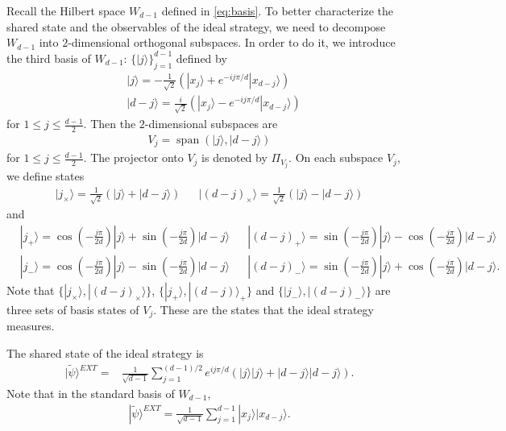 \documentclass[11pt,letterpaper]{article}
\newcommand{\ket}[1]{|#1\rangle}
\DeclareMathOperator{\spn}{span}
\newcommand{\1}{\mathbb{1}}
\newcommand{\EXT}{EXT}
\newcommand{\tpsi}{\tilde{\psi}}
\theoremstyle{definition}
\begin{document}
Recall the Hilbert space $W_{d-1}$ defined in \cref{eq:basis}. 
To better characterize the shared state and the observables of the ideal strategy, we need to decompose $W_{d-1}$ into $2$-dimensional
orthogonal subspaces.
In order to do it, we introduce the third basis of $W_{d-1}$: $\{ \ket{j} \}_{j=1}^{d-1}$ defined by
\begin{align}
    \label{eq:ketj}
    &\ket{j} = -\frac{1}{\sqrt{2}}(\ket{x_j} + e^{-ij\pi/d}\ket{x_{d-j}}) \\
    \label{eq:ketd-j}
    &\ket{d-j} = \frac{i}{\sqrt{2}}(\ket{x_j} - e^{-ij\pi/d}\ket{x_{d-j}})
\end{align}
for $1 \leq j \leq \frac{d-1}{2}$.
Then the $2$-dimensional subspaces are
\begin{align}
    \label{eq:vj}
    V_j = \spn( \ket{j}, \ket{d-j})
\end{align}
for $1 \leq j \leq \frac{d-1}{2}$.
The projector onto $V_j$ is denoted by $\Pi_{V_j}$. 
On each subspace $V_j$, we define states 
\begin{align}
    \ket{j_{\times}} = \frac{1}{\sqrt{2}}(\ket{j} + \ket{d-j}) &&
    \ket{(d-j)_{\times}} = \frac{1}{\sqrt{2}}(\ket{j} - \ket{d-j})
\end{align}
and
\begin{align}
    \label{eq:ketj+}
    &\ket{j_+} = \cos(-\frac{j\pi}{2d})\ket{j} + \sin(-\frac{j\pi}{2d})\ket{d-j}
	&&\ket{(d-j)_+} = \sin(-\frac{j\pi}{2d})\ket{j} - \cos(-\frac{j\pi}{2d})\ket{d-j}\\
	\label{eq:ketj-}
	&\ket{j_-} = \cos(-\frac{j\pi}{2d})\ket{j} - \sin(-\frac{j\pi}{2d})\ket{d-j}
	&&\ket{(d-j)_-} = \sin(-\frac{j\pi}{2d})\ket{j} + \cos(-\frac{j\pi}{2d})\ket{d-j}.
\end{align}
Note that $\{\ket{j_{\times}}, \ket{(d-j)_{\times}}\}$,
$\{\ket{j_+}, \ket{(d-j)}_+\}$ and $\{\ket{j_-}, \ket{(d-j)_-}\}$ are three sets of basis states of $V_j$.
These are the states that the ideal strategy measures.


The shared state of the ideal strategy is 
\begin{equation}
    \label{eq:tpsi}
    \begin{aligned}
        \ket{\tpsi}^{\EXT}
         =& \frac{1}{\sqrt{d-1}} \sum_{j=1}^{(d-1)/2} e^{ij\pi/d}(\ket{j}\ket{j} + \ket{d-j}\ket{d-j}).
    \end{aligned}
\end{equation}
Note that in the standard basis of $W_{d-1}$,
\begin{align*}
    \ket{\tpsi}^{\EXT} = \frac{1}{\sqrt{d-1}} \sum_{j=1}^{d-1} \ket{x_j}\ket{x_{d-j}}.
\end{align*}
\end{document}
